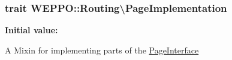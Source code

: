 \subsubsection[{\texorpdfstring{Page\+Implementation}{PageImplementation}}]{\setlength{\rightskip}{0pt plus 5cm}trait W\+E\+P\+P\+O\+::\+Routing\textbackslash{}\+Page\+Implementation}\hypertarget{namespaceWEPPO_1_1Routing_aac0fe5dacae50c1c13751c1c3087ea23}{}\label{namespaceWEPPO_1_1Routing_aac0fe5dacae50c1c13751c1c3087ea23}
{\bfseries Initial value\+:}
A Mixin for implementing parts of the \hyperlink{interfaceWEPPO_1_1Routing_1_1PageInterface}{Page\+Interface} 